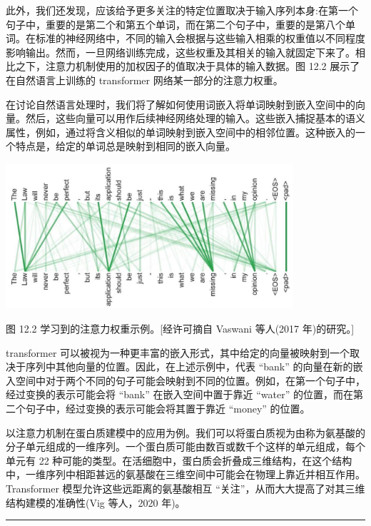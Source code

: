 \documentclass[10pt]{report}
\newcommand{\HRule}{\begin{center}\rule{0.9\linewidth}{0.2mm}\end{center}}
\begin{document}
此外，我们还发现，应该给予更多关注的特定位置取决于输入序列本身:在第一个句子中，重要的是第二个和第五个单词，而在第二个句子中，重要的是第八个单词。在标准的神经网络中，不同的输入会根据与这些输入相乘的权重值以不同程度影响输出。然而，一旦网络训练完成，这些权重及其相关的输入就固定下来了。相比之下，注意力机制使用的加权因子的值取决于具体的输入数据。图 12.2 展示了在自然语言上训练的 transformer 网络某一部分的注意力权重。

在讨论自然语言处理时，我们将了解如何使用词嵌入将单词映射到嵌入空间中的向量。然后，这些向量可以用作后续神经网络处理的输入。这些嵌入捕捉基本的语义属性，例如，通过将含义相似的单词映射到嵌入空间中的相邻位置。这种嵌入的一个特点是，给定的单词总是映射到相同的嵌入向量。

\begin{center}
\includegraphics[max width=0.8\textwidth]{images/0194e279-9b28-703a-88f4-c3ac21e2010d_379_375_354_1067_539_0.jpg}
\end{center}
\hspace*{3em} 

图 12.2 学习到的注意力权重示例。[经许可摘自 Vaswani 等人(2017 年)的研究。]

transformer 可以被视为一种更丰富的嵌入形式，其中给定的向量被映射到一个取决于序列中其他向量的位置。因此，在上述示例中，代表 “bank” 的向量在新的嵌入空间中对于两个不同的句子可能会映射到不同的位置。例如，在第一个句子中，经过变换的表示可能会将 “bank” 在嵌入空间中置于靠近 “water” 的位置，而在第二个句子中，经过变换的表示可能会将其置于靠近 “money” 的位置。

以注意力机制在蛋白质建模中的应用为例。我们可以将蛋白质视为由称为氨基酸的分子单元组成的一维序列。一个蛋白质可能由数百或数千个这样的单元组成，每个单元有 22 种可能的类型。在活细胞中，蛋白质会折叠成三维结构，在这个结构中，一维序列中相距甚远的氨基酸在三维空间中可能会在物理上靠近并相互作用。Transformer 模型允许这些远距离的氨基酸相互 “关注”，从而大大提高了对其三维结构建模的准确性(Vig 等人，2020 年)。

\HRule
\end{document}
